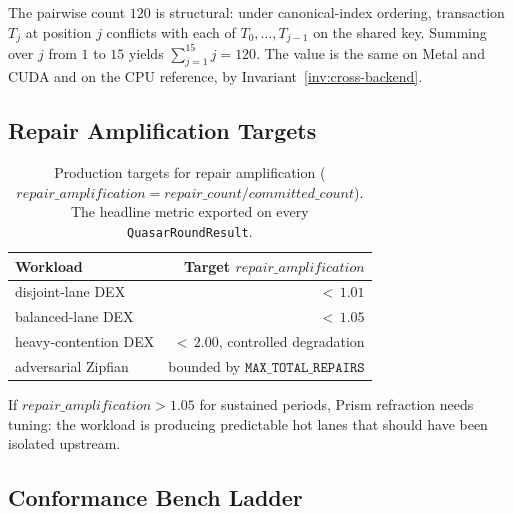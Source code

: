 \begin{remark}
\label{rem:exact-conflict}
The pairwise count $120$ is structural: under canonical-index
ordering, transaction $T_j$ at position $j$ conflicts with each
of $T_0, \ldots, T_{j-1}$ on the shared key. Summing over $j$ from
$1$ to $15$ yields $\sum_{j=1}^{15} j = 120$. The value is the
same on Metal and CUDA and on the CPU reference, by
Invariant~\ref{inv:cross-backend}.
\end{remark}

\subsection{Repair Amplification Targets}

\begin{table}[ht]
\centering
\begin{tabular}{@{}lr@{}}
\toprule
\textbf{Workload} & \textbf{Target $\mathit{repair\_amplification}$} \\
\midrule
disjoint-lane DEX                  & ${<}\,1.01$ \\
balanced-lane DEX                  & ${<}\,1.05$ \\
heavy-contention DEX               & ${<}\,2.00$, controlled degradation \\
adversarial Zipfian                & bounded by $\mathtt{MAX\_TOTAL\_REPAIRS}$ \\
\bottomrule
\end{tabular}
\caption{Production targets for repair amplification
($\mathit{repair\_amplification} =
\mathit{repair\_count}/\mathit{committed\_count}$). The headline
metric exported on every \texttt{QuasarRoundResult}.}
\label{tab:repair-amp}
\end{table}

If $\mathit{repair\_amplification} > 1.05$ for sustained periods,
Prism refraction needs tuning: the workload is producing predictable
hot lanes that should have been isolated upstream.

\subsection{Conformance Bench Ladder}

